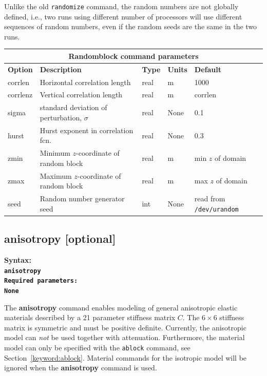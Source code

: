 \documentclass[11pt]{report}
\begin{document}
Unlike the old {\tt randomize} command, the random numbers are not globally defined, i.e., two runs using
different number of processors will use different sequences of random numbers, even if the random seeds
are the same in the two runs.

\begin{center}
\begin{tabular}{|l|p{8cm}|l|l||l|} \hline
\multicolumn{5}{|c|}{\bf Randomblock command parameters}\\ \hline
\bf{Option}  & \bf{Description} & \bf{Type} & \bf{Units} & \bf{Default} \\ \hline \hline
corrlen  & Horizontal correlation length & real & m & 1000 \\ \hline
corrlenz & Vertical correlation length & real & m & corrlen \\ \hline
sigma  & standard deviation of perturbation, $\sigma$  & real & None & 0.1 \\ \hline
hurst & Hurst exponent in correlation fcn. & real & None & 0.3 \\ \hline
zmin & Minimum $z$-coordinate of random block & real & m & min $z$ of domain \\ \hline
zmax & Maximum $z$-coordinate of random block & real & m & max $z$ of domain \\ \hline
seed & Random number generator seed & int & None & read from {\tt /dev/urandom} \\ \hline
\end{tabular}
\end{center}


\subsection{anisotropy [optional]}
\label{sec:anisotropy}
\begin{flushleft}\bf
Syntax:\\
\tt anisotropy\\
\bf Required parameters:\\
\rm None
\end{flushleft}
The {\bf anisotropy} command enables modeling of general anisotropic elastic materials described by
a 21 parameter stiffness matrix $C$. The $6\times 6$ stiffness matrix is symmetric and must be
positive definite. Currently, the anisotropic model can {\em not} be used together with attenuation.
Furthermore, the material model can only be specified with the \verb+ablock+ command, see
Section~\ref{keyword:ablock}. Material commands for the isotropic model will be ignored when
the {\bf anisotropy} command is used.
\end{document}
